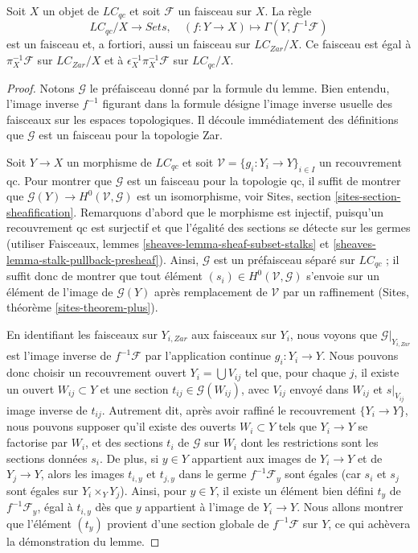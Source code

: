 \begin{lemma}
\label{lemma-describe-pullback-pi}
Soit $X$ un objet de $\textit{LC}_{qc}$ et soit $\mathcal{F}$ un faisceau
sur $X$. La règle
$$
\textit{LC}_{qc}/X \longrightarrow \textit{Sets},\quad
(f : Y \to X) \longmapsto \Gamma(Y, f^{-1}\mathcal{F})
$$
est un faisceau et, a fortiori, aussi un faisceau sur
$\textit{LC}_{Zar}/X$. Ce faisceau est égal à
$\pi_X^{-1}\mathcal{F}$ sur $\textit{LC}_{Zar}/X$ et à
$\epsilon_X^{-1}\pi_X^{-1}\mathcal{F}$ sur $\textit{LC}_{qc}/X$.
\end{lemma}

\begin{proof}
Notons $\mathcal{G}$ le préfaisceau donné par la formule du lemme.
Bien entendu, l'image inverse $f^{-1}$ figurant dans la formule désigne
l'image inverse usuelle des faisceaux sur les espaces topologiques.
Il découle immédiatement des définitions que $\mathcal{G}$ est un faisceau
pour la topologie Zar.

\medskip\noindent
Soit $Y \to X$ un morphisme de $\textit{LC}_{qc}$ et soit
$\mathcal{V} = \{g_i : Y_i \to Y\}_{i \in I}$ un recouvrement qc.
Pour montrer que $\mathcal{G}$ est un faisceau pour la topologie qc, il
suffit de montrer que
$\mathcal{G}(Y) \to H^0(\mathcal{V}, \mathcal{G})$
est un isomorphisme, voir Sites, section
\ref{sites-section-sheafification}. Remarquons d'abord que le morphisme est
injectif, puisqu'un recouvrement qc est surjectif et que l'égalité des
sections se détecte sur les germes (utiliser Faisceaux, lemmes
\ref{sheaves-lemma-sheaf-subset-stalks} et
\ref{sheaves-lemma-stalk-pullback-presheaf}). Ainsi, $\mathcal{G}$ est un
préfaisceau séparé sur $\textit{LC}_{qc}$ ; il suffit donc de montrer que
tout élément
$(s_i) \in H^0(\mathcal{V}, \mathcal{G})$
s'envoie sur un élément de l'image de $\mathcal{G}(Y)$ après remplacement de
$\mathcal{V}$ par un raffinement
(Sites, théorème \ref{sites-theorem-plus}).

\medskip\noindent
En identifiant les faisceaux sur $Y_{i, Zar}$ aux faisceaux sur $Y_i$, nous
voyons que $\mathcal{G}|_{Y_{i, Zar}}$ est l'image inverse de
$f^{-1}\mathcal{F}$ par l'application continue $g_i : Y_i \to Y$. Nous
pouvons donc choisir un recouvrement ouvert $Y_i = \bigcup V_{ij}$ tel que,
pour chaque $j$, il existe un ouvert $W_{ij} \subset Y$ et une section
$t_{ij} \in \mathcal{G}(W_{ij})$, avec $V_{ij}$ envoyé dans $W_{ij}$ et
$s|_{V_{ij}}$ image inverse de $t_{ij}$. Autrement dit, après avoir raffiné
le recouvrement $\{Y_i \to Y\}$, nous pouvons supposer qu'il existe des
ouverts $W_i \subset Y$ tels que $Y_i \to Y$ se factorise par $W_i$, et des
sections $t_i$ de $\mathcal{G}$ sur $W_i$ dont les restrictions sont les
sections données $s_i$. De plus, si $y \in Y$ appartient aux images de
$Y_i \to Y$ et de $Y_j \to Y$, alors les images $t_{i, y}$ et $t_{j, y}$
dans le germe $f^{-1}\mathcal{F}_y$ sont égales (car $s_i$ et $s_j$ sont
égales sur $Y_i \times_Y Y_j$). Ainsi, pour $y \in Y$, il existe un élément
bien défini $t_y$ de $f^{-1}\mathcal{F}_y$, égal à $t_{i, y}$ dès que $y$
appartient à l'image de $Y_i \to Y$.
Nous allons montrer que l'élément $(t_y)$ provient d'une section globale de
$f^{-1}\mathcal{F}$ sur $Y$, ce qui achèvera la démonstration du lemme.


\end{proof}
